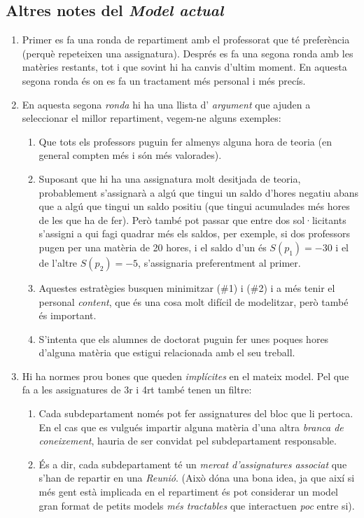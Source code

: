 \documentclass[10pt,twocolumn]{article}
\begin{document}
	\subsection{Altres notes del \textit{Model actual}}
	\begin{enumerate}
		\item Primer es fa una ronda de repartiment amb el professorat que té preferència (perquè repeteixen una assignatura). Després es fa una segona ronda amb les matèries restants, tot i que sovint hi ha canvis d'ultim moment. En aquesta segona ronda  és on es fa un tractament més personal i més precís. 
		\item En aquesta segona \textit{ronda} hi ha una llista d' \textit{argument} que ajuden a seleccionar el millor repartiment, vegem-ne alguns exemples:
		\begin{enumerate}
			\item Que tots els professors puguin fer almenys alguna hora de teoria (en general compten més i són més valorades).
			\item Suposant que hi ha una assignatura molt desitjada de teoria, probablement s'assignarà a algú que tingui un saldo d'hores negatiu abans que a algú que tingui un saldo positiu (que tingui acumulades més hores de les que ha de fer). Però també pot passar que entre dos sol·licitants s'assigni a qui fagi quadrar més els saldos, per exemple, si dos professors pugen per una matèria de 20 hores, i el saldo d'un és $S(p_1)=-30$ i el de l'altre  $S(p_2)=-5$, s'assignaria preferentment al primer.
			\item Aquestes estratègies busquen minimitzar (\#1) i (\#2) i a més tenir el personal \textit{content}, que és una cosa molt difícil de modelitzar, però també és important.
			\item S'intenta que els alumnes de doctorat puguin fer unes poques hores d'alguna matèria que estigui relacionada amb el seu treball.
		\end{enumerate} 
		\item Hi ha normes prou bones que queden \textit{implícites} en el mateix model. Pel que fa a les assignatures de 3r i 4rt  també tenen un filtre:
		\begin{enumerate}
	\item  Cada subdepartament només pot fer assignatures del bloc que li pertoca. En el cas que es vulgués impartir alguna matèria d'una altra \textit{branca de coneixement}, hauria de ser convidat pel subdepartament responsable.
	\item És a dir, cada subdepartament té un \textit{mercat d'assignatures associat} que s'han de repartir en una \textit{Reunió}. (Això dóna una bona idea, ja que així si més gent està implicada en el repartiment és pot considerar un model gran format de petits models \textit{més tractables} que interactuen \textit{poc} entre si).
			\end{enumerate}
		\end{enumerate}
\end{document}
